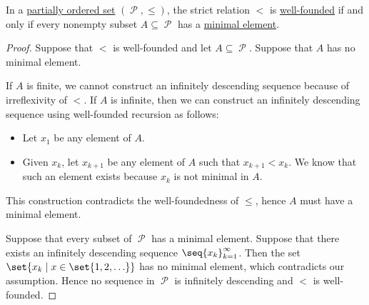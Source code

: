 \begin{proposition}\label{thm:infinite_descent_partial_order}
  In a \hyperref[def:partially_ordered_set]{partially ordered set} \( (\mscrP, \leq) \), the strict relation \( < \) is \hyperref[def:well_founded_relation]{well-founded} if and only if every nonempty subset \( A \subseteq \mscrP \) has a \hyperref[def:partially_ordered_set_extremal_points/maximal_and_minimal_element]{minimal element}.
\end{proposition}
\begin{proof}
  \SufficiencySubProof Suppose that \( < \) is well-founded and let \( A \subseteq \mscrP \). Suppose that \( A \) has no minimal element.

  If \( A \) is finite, we cannot construct an infinitely descending sequence because of irreflexivity of \( < \). If \( A \) is infinite, then we can construct an infinitely descending sequence using well-founded recursion as follows:
  \begin{itemize}
    \item Let \( x_1 \) be any element of \( A \).
    \item Given \( x_k \), let \( x_{k+1} \) be any element of \( A \) such that \( x_{k+1} < x_k \). We know that such an element exists because \( x_k \) is not minimal in \( A \).
  \end{itemize}

  This construction contradicts the well-foundedness of  \( \leq \), hence \( A \) must have a minimal element.

  \NecessitySubProof Suppose that every subset of \( \mscrP \) has a minimal element. Suppose that there exists an infinitely descending sequence \( \seq{ x_k }_{k=1}^\infty \). Then the set \( \set{ x_k \given x \in \set{ 1, 2, \ldots } } \) has no minimal element, which contradicts our assumption. Hence no sequence in \( \mscrP \) is infinitely descending and \( < \) is well-founded.
\end{proof}

